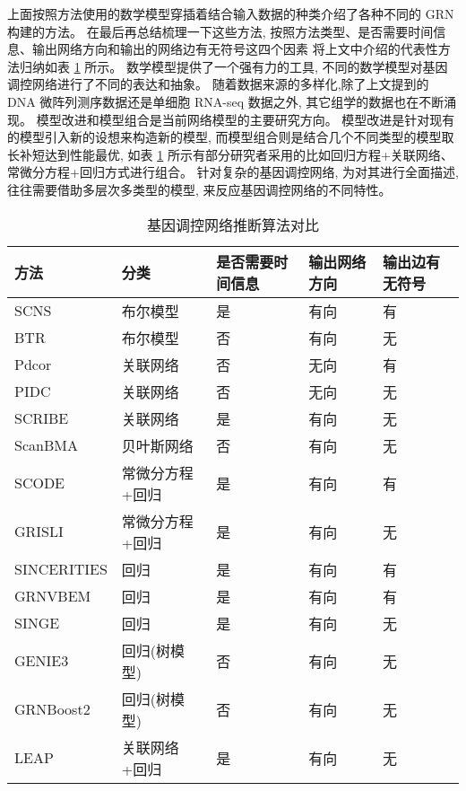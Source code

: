 上面按照方法使用的数学模型穿插着结合输入数据的种类介绍了各种不同的 GRN 构建的方法。 
在最后再总结梳理一下这些方法,
按照方法类型、是否需要时间信息、输出网络方向和输出的网络边有无符号这四个因素
将上文中介绍的代表性方法归纳如表 \ref{tbl:grns} 所示。
数学模型提供了一个强有力的工具,
不同的数学模型对基因调控网络进行了不同的表达和抽象。
随着数据来源的多样化,除了上文提到的 DNA 微阵列测序数据还是单细胞 RNA-seq 数据之外,
其它组学的数据也在不断涌现。
模型改进和模型组合是当前网络模型的主要研究方向。
模型改进是针对现有的模型引入新的设想来构造新的模型,
而模型组合则是结合几个不同类型的模型取长补短达到性能最优,
如表 \ref{tbl:grns} 所示有部分研究者采用的比如回归方程+关联网络、常微分方程+回归方式进行组合。
针对复杂的基因调控网络,
为对其进行全面描述,往往需要借助多层次多类型的模型, 
来反应基因调控网络的不同特性。
\begin{table}
    \centering
    \caption{基因调控网络推断算法对比}
    \label{tbl:grns} 
    \begin{tabular}{lllll} 
    \toprule
    方法&分类 &是否需要时间信息&输出网络方向&输出边有无符号\\
    \midrule
    SCNS        & 布尔模型     & 是 & 有向 & 有  \\
    BTR         & 布尔模型     & 否 & 有向 & 无  \\
    Pdcor       & 关联网络     & 否 & 无向 & 有  \\
    PIDC        & 关联网络      & 否 & 无向 & 无  \\
    SCRIBE      & 关联网络      & 是 & 有向 & 无  \\
    ScanBMA     & 贝叶斯网络   & 否 & 有向 & 无 \\
    SCODE       & 常微分方程+回归 & 是 & 有向 & 有  \\
    GRISLI      & 常微分方程+回归 & 是 & 有向 & 无  \\
    SINCERITIES & 回归       & 是 & 有向 & 有  \\
    GRNVBEM     & 回归       & 是 & 有向 & 有  \\
    SINGE       & 回归       & 是 & 有向 & 无  \\
    GENIE3      & 回归(树模型)     & 否 & 有向 & 无  \\
    GRNBoost2   & 回归(树模型)     & 否 & 有向 & 无  \\
    LEAP        & 关联网络+回归     & 是 & 有向 & 无  \\
    \bottomrule
    \end{tabular}
    \end{table}

